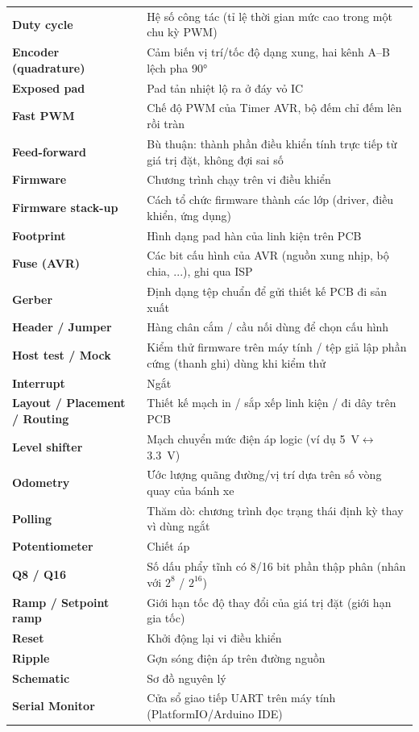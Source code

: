 {\begin{longtable}{@{}>{\raggedright\arraybackslash\bfseries}p{3.6cm}>{\raggedright\arraybackslash}p{11.3cm}@{}}
Duty cycle & Hệ số công tác (tỉ lệ thời gian mức cao trong một chu kỳ PWM)\\
Encoder (quadrature) & Cảm biến vị trí/tốc độ dạng xung, hai kênh A--B lệch pha \ang{90}\\
Exposed pad & Pad tản nhiệt lộ ra ở đáy vỏ IC\\
Fast PWM & Chế độ PWM của Timer AVR, bộ đếm chỉ đếm lên rồi tràn\\
Feed-forward & Bù thuận: thành phần điều khiển tính trực tiếp từ giá trị đặt, không đợi sai số\\
Firmware & Chương trình chạy trên vi điều khiển\\
Firmware stack-up & Cách tổ chức firmware thành các lớp (driver, điều khiển, ứng dụng)\\
Footprint & Hình dạng pad hàn của linh kiện trên PCB\\
Fuse (AVR) & Các bit cấu hình của AVR (nguồn xung nhịp, bộ chia, ...), ghi qua ISP\\
Gerber & Định dạng tệp chuẩn để gửi thiết kế PCB đi sản xuất\\
Header / Jumper & Hàng chân cắm / cầu nối dùng để chọn cấu hình\\
Host test / Mock & Kiểm thử firmware trên máy tính / tệp giả lập phần cứng (thanh ghi) dùng khi kiểm thử\\
Interrupt & Ngắt\\
Layout / Placement / Routing & Thiết kế mạch in / sắp xếp linh kiện / đi dây trên PCB\\
Level shifter & Mạch chuyển mức điện áp logic (ví dụ \SI{5}{\volt}$\leftrightarrow$\SI{3.3}{\volt})\\
Odometry & Ước lượng quãng đường/vị trí dựa trên số vòng quay của bánh xe\\
Polling & Thăm dò: chương trình đọc trạng thái định kỳ thay vì dùng ngắt\\
Potentiometer & Chiết áp\\
Q8 / Q16 & Số dấu phẩy tĩnh có 8/16 bit phần thập phân (nhân với $2^8$ / $2^{16}$)\\
Ramp / Setpoint ramp & Giới hạn tốc độ thay đổi của giá trị đặt (giới hạn gia tốc)\\
Reset & Khởi động lại vi điều khiển\\
Ripple & Gợn sóng điện áp trên đường nguồn\\
Schematic & Sơ đồ nguyên lý\\
Serial Monitor & Cửa sổ giao tiếp UART trên máy tính (PlatformIO/Arduino IDE)\\

\end{longtable}}
